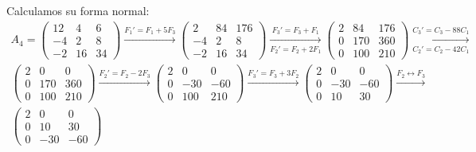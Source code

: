 \begin{ejercicio}
\begin{enumerate}
        Calculamos su forma normal:
        \begin{multline*}
            A_4 = \begin{pmatrix}
                12 & 4 & 6 \\
                -4 & 2 & 8 \\
                -2 & 16 & 34
            \end{pmatrix}
            \xrightarrow{F_1'=F_1+5F_3}
            \begin{pmatrix}
                2 & 84 & 176 \\
                -4 & 2 & 8 \\
                -2 & 16 & 34
            \end{pmatrix}
            \xrightarrow[F_2'=F_2+2F_1]{F_3'=F_3+F_1}
            \begin{pmatrix}
                2 & 84 & 176 \\
                0 & 170 & 360 \\
                0 & 100 & 210
            \end{pmatrix}
            \xrightarrow[C_2'=C_2-42C_1]{C_3'=C_3-88C_1}\\
            \begin{pmatrix}
                2 & 0 & 0 \\
                0 & 170 & 360 \\
                0 & 100 & 210
            \end{pmatrix}
            \xrightarrow{F_2'=F_2-2F_3}
            \begin{pmatrix}
                2 & 0 & 0 \\
                0 & -30 & -60 \\
                0 & 100 & 210
            \end{pmatrix}
            \xrightarrow{F_3'=F_3+3F_2}
            \begin{pmatrix}
                2 & 0 & 0 \\
                0 & -30 & -60 \\
                0 & 10 & 30
            \end{pmatrix}
            \xrightarrow{F_2\leftrightarrow F_3}\\
            \begin{pmatrix}
                2 & 0 & 0 \\
                0 & 10 & 30 \\
                0 & -30 & -60
            \end{pmatrix}

\end{multline*}
\end{enumerate}
\end{ejercicio}

